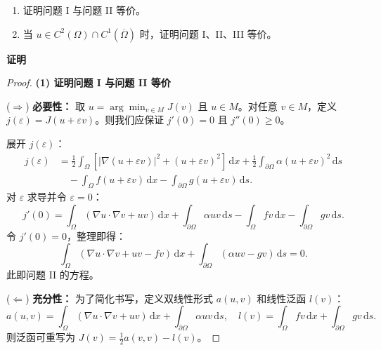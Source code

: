 \documentclass[12pt,a4paper]{ctexart}
\begin{document}
	\begin{enumerate}
		\item[(1)] 证明问题 I 与问题 II 等价。
		\item[(2)] 当 $u \in C^2(\Omega) \cap C^1(\overline{\Omega})$ 时，证明问题 I、II、III 等价。
	\end{enumerate}
	
	\noindent\textbf{证明}
	
	\noindent{}
	
	\begin{proof}
		\textbf{(1) 证明问题 I 与问题 II 等价}
		
		\noindent ($\Longrightarrow$) \textbf{必要性：}
		取 $u = \arg\min_{v \in M} J(v)$ 且 $u \in M$。对任意 $v \in M$，定义 $j(\varepsilon) = J(u + \varepsilon v)$。则我们应保证 $j'(0) = 0$ 且 $j''(0) \geqslant 0$。
		
		展开 $j(\varepsilon)$：
		\[
		\begin{aligned}
			j(\varepsilon) &= \frac{1}{2}\int_{\Omega} [|\nabla(u+\varepsilon v)|^2 + (u+\varepsilon v)^2] \,\mathrm{d}x + \frac{1}{2}\int_{\partial\Omega} \alpha(u+\varepsilon v)^2 \,\mathrm{d}s \\
			&\quad - \int_{\Omega} f(u+\varepsilon v) \,\mathrm{d}x - \int_{\partial\Omega} g(u+\varepsilon v) \,\mathrm{d}s.
		\end{aligned}
		\]
		对 $\varepsilon$ 求导并令 $\varepsilon = 0$：
		\[
		j'(0) = \int_{\Omega} (\nabla u \cdot \nabla v + uv) \,\mathrm{d}x + \int_{\partial\Omega} \alpha uv \,\mathrm{d}s - \int_{\Omega} fv \,\mathrm{d}x - \int_{\partial\Omega} gv \,\mathrm{d}s.
		\]
		令 $j'(0)=0$，整理即得：
		\[
		\int_{\Omega} (\nabla u \cdot \nabla v + uv - fv) \,\mathrm{d}x + \int_{\partial\Omega} (\alpha uv - gv) \,\mathrm{d}s = 0.
		\]
		此即问题 II 的方程。
		
		\vspace{1em}
		\noindent ($\Longleftarrow$) \textbf{充分性：}
		为了简化书写，定义双线性形式 $a(u,v)$ 和线性泛函 $l(v)$：
		\[
		a(u,v) = \int_{\Omega} (\nabla u \cdot \nabla v + uv) \,\mathrm{d}x + \int_{\partial\Omega} \alpha uv \,\mathrm{d}s, \quad l(v) = \int_{\Omega} fv \,\mathrm{d}x + \int_{\partial\Omega} gv \,\mathrm{d}s.
		\]
		则泛函可重写为 $J(v) = \frac{1}{2}a(v,v) - l(v)$。
		

\end{proof}
\end{document}
